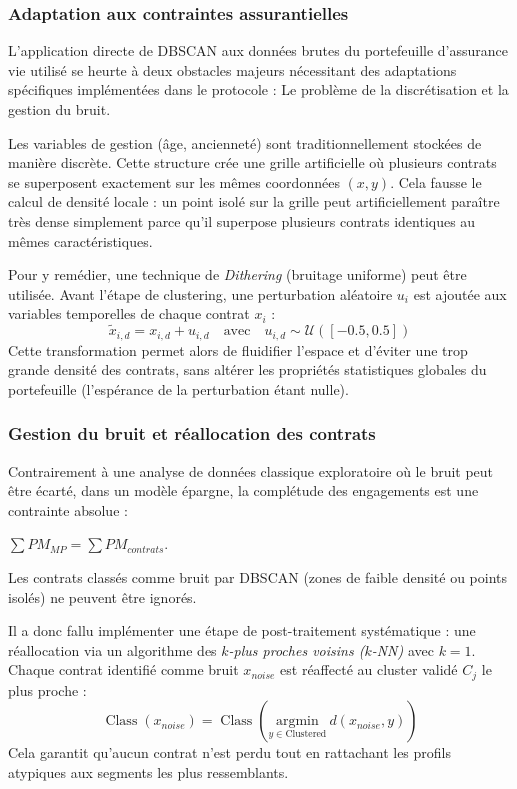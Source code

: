 \subsubsection{Adaptation aux contraintes assurantielles}
L'application directe de DBSCAN aux données brutes du portefeuille d'assurance vie utilisé se heurte à deux obstacles majeurs nécessitant des adaptations spécifiques implémentées dans le protocole : Le problème de la discrétisation et la gestion du bruit.

Les variables de gestion (âge, ancienneté) sont traditionnellement stockées de manière discrète. Cette structure crée une grille artificielle où plusieurs contrats se superposent exactement sur les mêmes coordonnées $(x,y)$. Cela fausse le calcul de densité locale : un point isolé sur la grille peut artificiellement paraître très dense simplement parce qu'il superpose plusieurs contrats identiques au mêmes caractéristiques.

Pour y remédier, une technique de \textit{Dithering} (bruitage uniforme) peut être utilisée. Avant l'étape de clustering, une perturbation aléatoire $u_i$ est ajoutée aux variables temporelles de chaque contrat $x_i$ :
\begin{equation}
    \tilde{x}_{i, d} = x_{i, d} + u_{i, d} \quad \text{avec} \quad u_{i, d} \sim \mathcal{U}([-0.5, 0.5])
\end{equation}
Cette transformation permet alors de fluidifier l'espace et d'éviter une trop grande densité des contrats, sans altérer les propriétés statistiques globales du portefeuille (l'espérance de la perturbation étant nulle).

\subsubsection{Gestion du bruit et réallocation des contrats}
Contrairement à une analyse de données classique exploratoire où le bruit peut être écarté, dans un modèle épargne, la complétude des engagements est une contrainte absolue :     

$\sum PM_{MP} = \sum PM_{contrats}$.

Les contrats classés comme \og bruit \fg{} par DBSCAN (zones de faible densité ou points isolés) ne peuvent être ignorés.

Il a donc fallu implémenter une étape de post-traitement systématique : une réallocation via un algorithme des \textit{$k$-plus proches voisins ($k$-NN)} avec $k=1$. Chaque contrat identifié comme bruit $x_{noise}$ est réaffecté au cluster validé $C_j$ le plus proche :
\begin{equation}
    \operatorname{Class}(x_{noise}) = \operatorname{Class}\left(\underset{y \in \text{Clustered}}{\text{argmin}} \ d(x_{noise}, y)\right)
\end{equation}
Cela garantit qu'aucun contrat n'est perdu tout en rattachant les profils atypiques aux segments les plus ressemblants.

